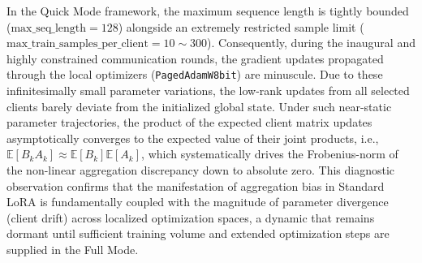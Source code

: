 \documentclass[journal]{IEEEtran}
\begin{document}
In the Quick Mode framework, the maximum sequence length is tightly bounded ($\text{max\_seq\_length}=128$) alongside an extremely restricted sample limit ($\text{max\_train\_samples\_per\_client}=10 \sim 300$). Consequently, during the inaugural and highly constrained communication rounds, the gradient updates propagated through the local optimizers (\texttt{PagedAdamW8bit}) are minuscule. Due to these infinitesimally small parameter variations, the low-rank updates from all selected clients barely deviate from the initialized global state. Under such near-static parameter trajectories, the product of the expected client matrix updates asymptotically converges to the expected value of their joint products, i.e., $\mathbb{E}[B_k A_k] \approx \mathbb{E}[B_k]\mathbb{E}[A_k]$, which systematically drives the Frobenius-norm of the non-linear aggregation discrepancy down to absolute zero. This diagnostic observation confirms that the manifestation of aggregation bias in Standard LoRA is fundamentally coupled with the magnitude of parameter divergence (client drift) across localized optimization spaces, a dynamic that remains dormant until sufficient training volume and extended optimization steps are supplied in the Full Mode.




%
\end{document}
